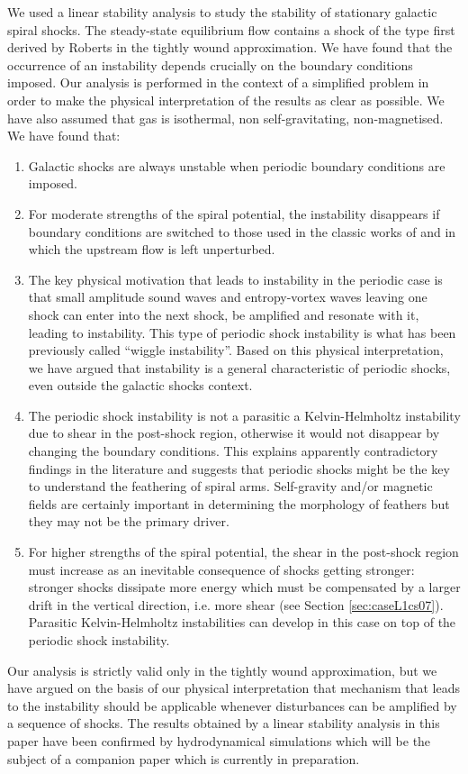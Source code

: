 \documentclass[useAMS,usenatbib]{mn2e}
\begin{document}
We used a linear stability analysis to study the stability of stationary galactic spiral shocks. The steady-state equilibrium flow contains a shock of the type first derived by Roberts in the tightly wound approximation. We have found that the occurrence of an instability depends crucially on the boundary conditions imposed. Our analysis is performed in the context of a simplified problem in order to make the physical interpretation of the results as clear as possible. We have also assumed that gas is isothermal, non self-gravitating, non-magnetised. We have found that:
\begin{enumerate}
\item Galactic shocks are always unstable when periodic boundary conditions are imposed.
\item For moderate strengths of the spiral potential, the instability disappears if boundary conditions are switched to those used in the classic works of \cite{Dyakov54} and \cite{Kontorovich58} in which the upstream flow is left unperturbed. 
\item The key physical motivation that leads to instability in the periodic case is that small amplitude sound waves and entropy-vortex waves leaving one shock can enter into the next shock, be amplified and resonate with it, leading to instability. This type of periodic shock instability is what has been previously called ``wiggle instability''. Based on this physical interpretation, we have argued that instability is a general characteristic of periodic shocks, even outside the galactic shocks context.
\item The periodic shock instability is not a parasitic a Kelvin-Helmholtz instability due to shear in the post-shock region, otherwise it would not disappear by changing the boundary conditions. This explains apparently contradictory findings in the literature and suggests that periodic shocks might be the key to understand the feathering of spiral arms. Self-gravity and/or magnetic fields are certainly important in determining the morphology of feathers but they may not be the primary driver.
\item For higher strengths of the spiral potential, the shear in the post-shock region must increase as an inevitable consequence of shocks getting stronger: stronger shocks dissipate more energy which must be compensated by a larger drift in the vertical direction, i.e. more shear (see Section \ref{sec:caseL1cs07}). Parasitic Kelvin-Helmholtz instabilities can develop in this case on top of the periodic shock instability.
\end{enumerate}
%
Our analysis is strictly valid only in the tightly wound approximation, but we have argued on the basis of our physical interpretation that mechanism that leads to the instability should be applicable whenever disturbances can be amplified by a sequence of shocks. The results obtained by a linear stability analysis in this paper have been confirmed by hydrodynamical simulations which will be the subject of a companion paper which is currently in preparation.
\end{document}
